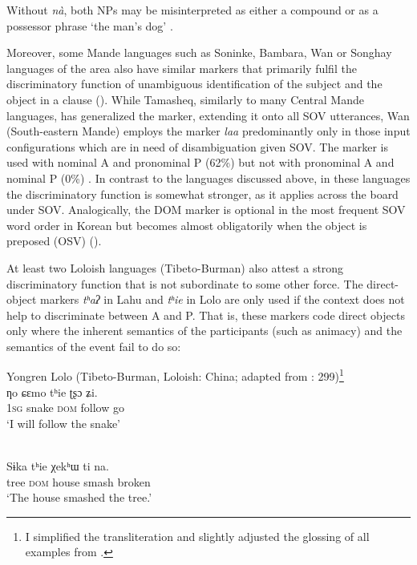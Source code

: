 \documentclass[output=paper]{langsci/langscibook}
\begin{document}
Without \textit{nà}, both NPs may be misinterpreted as either a compound or as a possessor phrase ‘the man’s dog’ \citep[91]{Heath2007}.

Moreover, some Mande languages such as Soninke, Bambara, Wan or Songhay languages of the area also have similar markers that primarily fulfil the discriminatory function of unambiguous identification of the subject and the object in a clause (\citealt{Heath2007,CreisselsDiagne2013,Nikitina2018}). While Tamasheq, similarly to many Central Mande languages, has generalized the marker, extending it onto all SOV utterances, Wan (South-eastern Mande) employs the marker \textit{laa} predominantly only in those input configurations which are in need of disambiguation given SOV. The marker is used with nominal A and pronominal P (62\%) but not with pronominal A and nominal P (0\%) \citep[202]{Nikitina2018}. In contrast to the languages discussed above, in these languages the discriminatory function is somewhat stronger, as it applies across the board under SOV. Analogically, the DOM marker is optional in the most frequent SOV word order in Korean but becomes almost obligatorily when the object is preposed (OSV) (\citealt{AhnCho2007}).

At least two Loloish languages (Tibeto-Burman) also attest a strong discriminatory function that is not subordinate to some other force. The direct-object markers \textit{tʰ}\textit{aʔ} in Lahu and \textit{tʰ}\textit{ie} in Lolo are only used if the context does not help to discriminate between A and P. That is, these markers code direct objects only where the inherent semantics of the participants (such as animacy) and the semantics of the event fail to do so:

\ea\label{ex:serzant:25}
Yongren Lolo (Tibeto-Burman, Loloish: China; adapted from \citealt{Gerner2008}: 299)\footnote{I simplified the transliteration and slightly adjusted the glossing of all examples from \citet{Gerner2008}.}\\
\gll ƞo   ɕεmo   tʰie   ʈʂɔ   ʑi.\\
     1\textsc{sg}  snake  \textsc{dom}  follow  go\\
\glt ‘I will follow the snake’
\z

\ea\label{ex:serzant:26}
\\
\gll Sɨka   tʰie   χekʰɯ   ti   na.\\
     tree  \textsc{dom}  house  smash  broken\\
\glt ‘The house smashed the tree.’
\z
\end{document}

